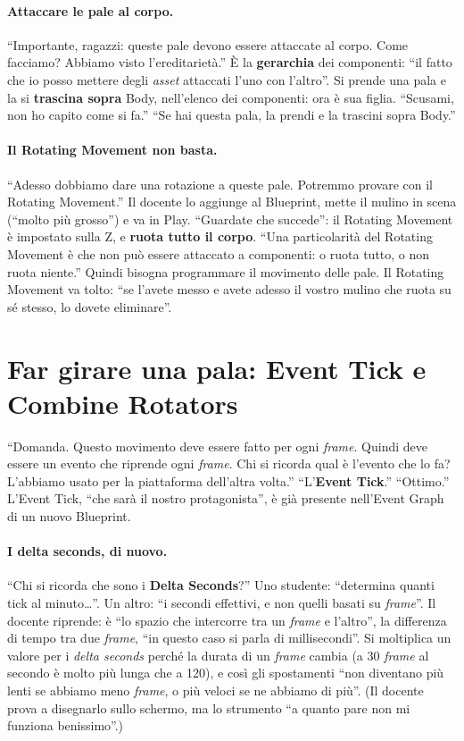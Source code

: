 \paragraph{Attaccare le pale al corpo.} ``Importante, ragazzi: queste pale devono essere
attaccate al corpo. Come facciamo? Abbiamo visto l'ereditarietà.'' È la
\textbf{gerarchia} dei componenti: ``il fatto che io posso mettere degli \emph{asset}
attaccati l'uno con l'altro''. Si prende una pala e la si \textbf{trascina sopra} Body,
nell'elenco dei componenti: ora è sua figlia. ``Scusami, non ho capito come si fa.''
``Se hai questa pala, la prendi e la trascini sopra Body.''

\paragraph{Il Rotating Movement non basta.} ``Adesso dobbiamo dare una rotazione a
queste pale. Potremmo provare con il Rotating Movement.'' Il docente lo aggiunge al
Blueprint, mette il mulino in scena (``molto più grosso'') e va in Play. ``Guardate che
succede'': il Rotating Movement è impostato sulla Z, e \textbf{ruota tutto il corpo}.
``Una particolarità del Rotating Movement è che non può essere attaccato a
componenti: o ruota tutto, o non ruota niente.'' Quindi bisogna programmare il
movimento delle pale. Il Rotating Movement va tolto: ``se l'avete messo e avete adesso
il vostro mulino che ruota su sé stesso, lo dovete eliminare''.

\section{Far girare una pala: Event Tick e Combine Rotators}
\label{ue4:sec:pala}

``Domanda. Questo movimento deve essere fatto per ogni \emph{frame}. Quindi deve essere
un evento che riprende ogni \emph{frame}. Chi si ricorda qual è l'evento che lo fa? L'abbiamo
usato per la piattaforma dell'altra volta.'' ``L'\textbf{Event Tick}.'' ``Ottimo.''
L'Event Tick, ``che sarà il nostro protagonista'', è già presente nell'Event Graph di un
nuovo Blueprint.

\paragraph{I delta seconds, di nuovo.} ``Chi si ricorda che sono i \textbf{Delta
Seconds}?'' Uno studente: ``determina quanti tick al minuto\ldots''. Un altro: ``i
secondi effettivi, e non quelli basati su \emph{frame}''. Il docente riprende: è ``lo
spazio che intercorre tra un \emph{frame} e l'altro'', la differenza di tempo tra due
\emph{frame}, ``in questo caso si parla di millisecondi''. Si moltiplica un valore per i
\emph{delta seconds} perché la durata di un \emph{frame} cambia (a 30 \emph{frame} al
secondo è molto più lunga che a 120), e così gli spostamenti ``non diventano più lenti
se abbiamo meno \emph{frame}, o più veloci se ne abbiamo di più''. (Il docente prova a
disegnarlo sullo schermo, ma lo strumento ``a quanto pare non mi funziona benissimo''.)

